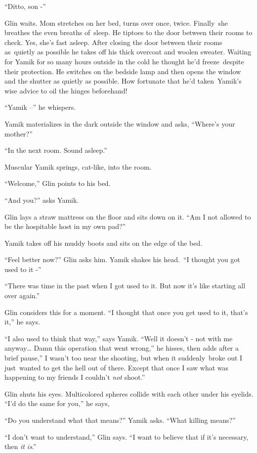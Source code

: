 \documentclass[twoside,11pt]{book}
\begin{document}
``Ditto, son -''

Glin waits. Mom stretches on her bed, turns over once, twice. Finally\ she breathes the even breaths of~sleep. He
tiptoes to the door between their rooms to check. Yes, she's fast asleep. After closing the door between their rooms
as~quietly as possible he takes off his thick overcoat and woolen sweater. Waiting for Yamik for so many hours outside
in the cold he thought he'd freeze\ despite their protection. He switches on the bedside lamp and then opens the window
and the shutter as quietly as possible. How fortunate that h{e}{}'d
taken{\ }Yamik's wise advice to oil the hinges beforehand!

 ``Yamik --'' he whispers.

Yamik materializes in the dark outside the window and asks, ``Where's your mother?'' 

``In the next room. Sound asleep.'' 

Muscular Yamik springs, cat-like, into the room. 

``Welcome,'' Glin points to his bed. 

``And you?'' asks Yamik.~ 

Glin lays a straw mattress on the floor and sits down on it. ``Am I not allowed to be the hospitable host
in my own pad?''

Yamik takes off his muddy boots and sits on the edge of the bed. 

``Feel better now?'' Glin asks him. Yamik shakes his
head.{\ }``I thought you got used to it -'' 

``There was time in the past when I got used to it. But now it's like starting all over
again.'' 

Glin considers this for a moment. ``I thought that once you get used to it, that's it,'' he
says.

``I also used to think that way,'' says Yamik. ``Well it doesn't - not with me anyway{\dots} Damn this
operation that went wrong,'' he hisses, then adds after a brief pause,'' I wasn't too near
the shooting, but when it suddenly{\ }broke out I
just{\ }wanted to get the hell out of there. Except that once I saw what was
happening to my friends I couldn't \textit{not} shoot.'' 

Glin shuts his eyes. Multicolored spheres collide with each other under his eyelids. ``I'd do the same for
you,'' he says,

``Do you understand what that means?'' Yamik asks. ``What killing
means?'' 

``I don't want to understand,'' Glin says. ``I want to believe that if it's
necessary, then \textit{it is}.''
\end{document}
